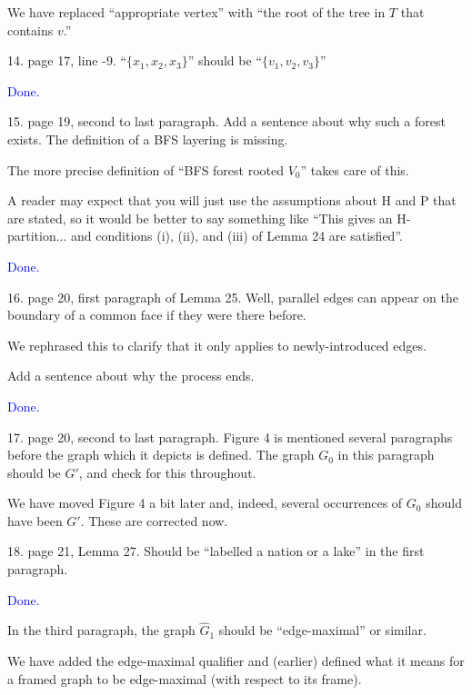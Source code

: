 \documentclass[12pt]{article}
\newcommand{\done}{\textcolor{blue}{Done.}}
\newenvironment{response}{\color{blue}}{}
\begin{document}
\begin{response}
  We have replaced ``appropriate vertex'' with ``the root of the tree in $T$ that contains $v$.''
\end{response}


14. page 17, line -9. “$\{x_1, x_2, x_3\}$” should be “$\{v_1, v_2, v_3\}$”

\done

15. page 19, second to last paragraph. Add a sentence about why such
a forest exists. The definition of a BFS layering is missing.


\begin{response}
  The more precise definition of ``BFS forest rooted $V_0$'' takes care of this.
\end{response}

A reader may expect that you will just use the assumptions about H and P that are stated, so it would be better to say something like “This gives an H-partition... and conditions (i), (ii), and (iii) of Lemma 24 are satisfied”.

\done


16. page 20, first paragraph of Lemma 25. Well, parallel edges can appear
on the boundary of a common face if they were there before.

\begin{response}
  We rephrased this to clarify that it only applies to newly-introduced edges.
\end{response}


Add a sentence about why the process ends.

\done

17. page 20, second to last paragraph. Figure 4 is mentioned several paragraphs before the graph which it depicts is defined. The graph $G_0$ in
this paragraph should be $G'$, and check for this throughout.

\begin{response}
  We have moved Figure 4 a bit later and, indeed, several occurrences of $G_0$ should have been $G'$.  These are corrected now.
\end{response}

18. page 21, Lemma 27. Should be “labelled a nation or a lake” in the
first paragraph.

\done

In the third paragraph, the graph $\hat{G}_1$ should be “edge-maximal” or similar.

\begin{response}
  We have added the edge-maximal qualifier and (earlier) defined what it means for a framed graph to be edge-maximal (with respect to its frame).
\end{response}
\end{document}
